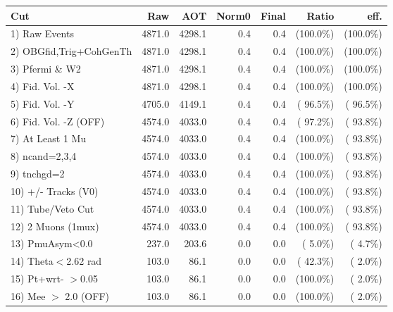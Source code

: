  \begin{table}[h!]\centering
 \begin{tabular}{||l||r|r|r|r|r|r||}
 \hline
 \hline
 Cut & Raw & AOT & Norm0 & Final & Ratio & eff.       \\
 \hline
  1) Raw Events           &       4871.0 &       4298.1 &          0.4 &          0.4 & (100.0\%) & (100.0\%) \\
  2) OBGfid,Trig+CohGenTh &       4871.0 &       4298.1 &          0.4 &          0.4 & (100.0\%) & (100.0\%) \\
  3) Pfermi \& W2         &       4871.0 &       4298.1 &          0.4 &          0.4 & (100.0\%) & (100.0\%) \\
  4) Fid. Vol. -X         &       4871.0 &       4298.1 &          0.4 &          0.4 & (100.0\%) & (100.0\%) \\
  5) Fid. Vol. -Y         &       4705.0 &       4149.1 &          0.4 &          0.4 & ( 96.5\%) & ( 96.5\%) \\
  6) Fid. Vol. -Z (OFF)   &       4574.0 &       4033.0 &          0.4 &          0.4 & ( 97.2\%) & ( 93.8\%) \\
  7) At Least 1 Mu        &       4574.0 &       4033.0 &          0.4 &          0.4 & (100.0\%) & ( 93.8\%) \\
  8) ncand=2,3,4          &       4574.0 &       4033.0 &          0.4 &          0.4 & (100.0\%) & ( 93.8\%) \\
  9) tnchgd=2             &       4574.0 &       4033.0 &          0.4 &          0.4 & (100.0\%) & ( 93.8\%) \\
 10) +/- Tracks (V0)      &       4574.0 &       4033.0 &          0.4 &          0.4 & (100.0\%) & ( 93.8\%) \\
 11) Tube/Veto Cut        &       4574.0 &       4033.0 &          0.4 &          0.4 & (100.0\%) & ( 93.8\%) \\
 12) 2 Muons (1mux)       &       4574.0 &       4033.0 &          0.4 &          0.4 & (100.0\%) & ( 93.8\%) \\
 13) PmuAsym<0.0          &        237.0 &        203.6 &          0.0 &          0.0 & (  5.0\%) & (  4.7\%) \\
 14) Theta$<$2.62 rad     &        103.0 &         86.1 &          0.0 &          0.0 & ( 42.3\%) & (  2.0\%) \\
 15) Pt+wrt- $>$0.05      &        103.0 &         86.1 &          0.0 &          0.0 & (100.0\%) & (  2.0\%) \\
 16) Mee $>$ 2.0  (OFF)   &        103.0 &         86.1 &          0.0 &          0.0 & (100.0\%) & (  2.0\%) \\

\end{tabular}
\end{table}
